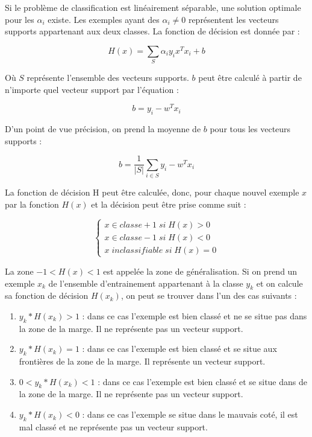 \documentclass[12pt,a4paper]{report}
\begin{document}
Si le problème de classification est linéairement séparable, une solution optimale pour les $\alpha_{i}$ existe. Les exemples ayant des $\alpha_{i} \neq 0$ représentent les vecteurs supports appartenant aux deux classes. La fonction de décision est donnée par :

$$
H(x)=\sum_{S} \alpha_{i} y_{i} x^{T} x_{i}+b
$$

Où $S$ représente l'ensemble des vecteurs supports. $b$ peut être calculé à partir de n'importe quel vecteur support par l'équation :

$$
b=y_{i}-w^{T} x_{i}
$$

D'un point de vue précision, on prend la moyenne de $b$ pour tous les vecteurs supports :

$$
b=\frac{1}{|S|} \sum_{i \in S} y_{i}-w^{T} x_{i}
$$

La fonction de décision $\mathrm{H}$ peut être calculée, donc, pour chaque nouvel exemple $x$ par la fonction $H(x)$ et la décision peut être prise comme suit :
\begin{center}
$$
\begin{cases}x\in classe + 1\; si \;H(x)>0 \\ x\in classe - 1\; si \;H(x)<0 \\  x\;inclassifiable\; si \;H(x)=0\end{cases}
$$
\end{center}

La zone $-1<H(x)<1$ est appelée la zone de généralisation.
Si on prend un exemple $x_{k}$ de l'ensemble d'entrainement appartenant à la classe $y_{k}$ et on calcule sa fonction de décision $H\left(x_{k}\right)$, on peut se trouver dans l'un des cas suivants :

\begin{enumerate}
	\item $y_{k} * H\left(x_{k}\right)>1$ : dans ce cas l'exemple est bien classé et ne se situe pas dans la zone de la marge. Il ne représente pas un vecteur support.
	
	\item $y_{k} * H\left(x_{k}\right)=1$ : dans ce cas l'exemple est bien classé et se situe aux frontières de la zone de la marge. Il représente un vecteur support.
	
	\item $0<y_{k} * H\left(x_{k}\right)<1$ : dans ce cas l'exemple est bien classé et se situe dans de la zone de la marge. Il ne représente pas un vecteur support.
	
	\item $y_{k} * H\left(x_{k}\right)<0$ : dans ce cas l'exemple se situe dans le mauvais coté, il est mal classé et ne représente pas un vecteur support.
	
\end{enumerate}
\end{document}
